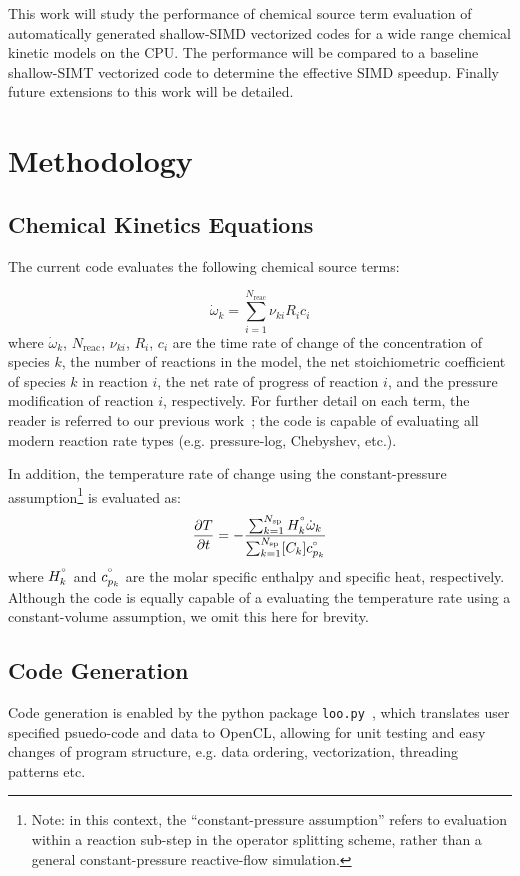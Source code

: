 \documentclass[12pt]{ussci}
\begin{document}
This work will study the performance of chemical source term evaluation of automatically generated shallow-SIMD vectorized codes for a wide range chemical kinetic models on the CPU.
The performance will be compared to a baseline shallow-SIMT vectorized code to determine the effective SIMD speedup.
Finally future extensions to this work will be detailed.

\section{Methodology}
\subsection{Chemical Kinetics Equations}
The current code evaluates the following chemical source terms:

\begin{equation}
\dot{\omega}_k = \sum_{i=1}^{N_{\text{reac}}} \nu_{ki} R_i c_i
\end{equation}
where $\dot{\omega}_k$, $N_{\text{reac}}$, $\nu_{ki}$, ${R_i}$, $c_i$ are the time rate of change of the concentration of species $k$, the number of reactions in the model, the net stoichiometric coefficient of species $k$ in reaction $i$, the net rate of progress of reaction $i$, and the pressure modification of reaction $i$, respectively.
For further detail on each term, the reader is referred to our previous work~\cite{Niemeyer:2016aa}; the code is capable of evaluating all modern reaction rate types (e.g. pressure-log, Chebyshev, etc.).

In addition, the temperature rate of change using the constant-pressure assumption\footnote{Note: in this context, the ``constant-pressure assumption'' refers to evaluation within a reaction sub-step in the operator splitting scheme, rather than a general constant-pressure reactive-flow simulation.} is evaluated as:
\begin{equation}
\frac{\partial T}{\partial t} = -\frac{\sum_{k=1}^{N_{\text{sp}}} H^{\degree}_k \dot{\omega}_k}{\sum_{k=1}^{N_{\text{sp}}} [C_k] c_{p_k}^{\degree}}
\end{equation}
where $H^{\degree}_k$ and $c_{p_k}^{\degree}$ are the molar specific enthalpy and specific heat, respectively.
Although the code is equally capable of a evaluating the temperature rate using a constant-volume assumption, we omit this here for brevity.

\subsection{Code Generation}
Code generation is enabled by the python package \texttt{loo.py}~\cite{kloeckner_loopy_2014}, which translates user specified psuedo-code and data to OpenCL, allowing for unit testing and easy changes of program structure, e.g. data ordering, vectorization, threading patterns etc.
\end{document}
